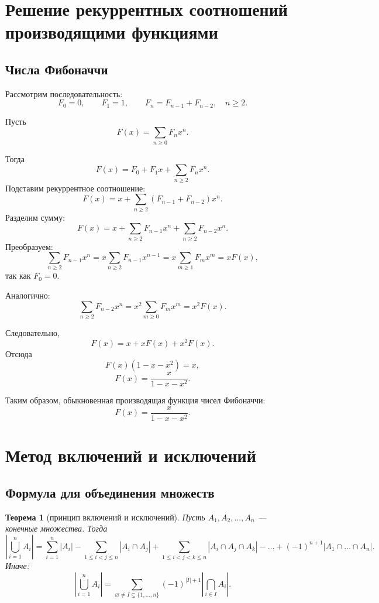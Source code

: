\documentclass[12pt,a4paper]{article}
\newtheorem{theorem}{Теорема}
\begin{document}
\section{Решение рекуррентных соотношений производящими функциями}

\subsection{Числа Фибоначчи}

Рассмотрим последовательность:
\[
F_0=0,\qquad F_1=1,\qquad F_n=F_{n-1}+F_{n-2},\quad n\ge 2.
\]

Пусть
\[
F(x)=\sum_{n\ge 0}F_nx^n.
\]

Тогда
\[
F(x)=F_0+F_1x+\sum_{n\ge 2}F_nx^n.
\]
Подставим рекуррентное соотношение:
\[
F(x)=x+\sum_{n\ge 2}(F_{n-1}+F_{n-2})x^n.
\]
Разделим сумму:
\[
F(x)=x+\sum_{n\ge 2}F_{n-1}x^n+\sum_{n\ge 2}F_{n-2}x^n.
\]
Преобразуем:
\[
\sum_{n\ge 2}F_{n-1}x^n
=
x\sum_{n\ge 2}F_{n-1}x^{n-1}
=
x\sum_{m\ge 1}F_mx^m
=
xF(x),
\]
так как $F_0=0$.

Аналогично:
\[
\sum_{n\ge 2}F_{n-2}x^n
=
x^2\sum_{m\ge 0}F_mx^m
=
x^2F(x).
\]

Следовательно,
\[
F(x)=x+xF(x)+x^2F(x).
\]
Отсюда
\[
F(x)(1-x-x^2)=x,
\]
\[
F(x)=\frac{x}{1-x-x^2}.
\]

Таким образом, обыкновенная производящая функция чисел Фибоначчи:
\[
\boxed{
F(x)=\frac{x}{1-x-x^2}.
}
\]

\section{Метод включений и исключений}

\subsection{Формула для объединения множеств}

\begin{theorem}[принцип включений и исключений]
Пусть $A_1,A_2,\dots,A_n$ --- конечные множества. Тогда
\[
\left|\bigcup_{i=1}^n A_i\right|
=
\sum_{i=1}^n |A_i|
-
\sum_{1\le i<j\le n}|A_i\cap A_j|
+
\sum_{1\le i<j<k\le n}|A_i\cap A_j\cap A_k|
-\dots
+
(-1)^{n+1}|A_1\cap\dots\cap A_n|.
\]
Иначе:
\[
\left|\bigcup_{i=1}^n A_i\right|
=
\sum_{\varnothing\neq I\subseteq \{1,\dots,n\}}
(-1)^{|I|+1}
\left|\bigcap_{i\in I}A_i\right|.
\]
\end{theorem}
\end{document}
